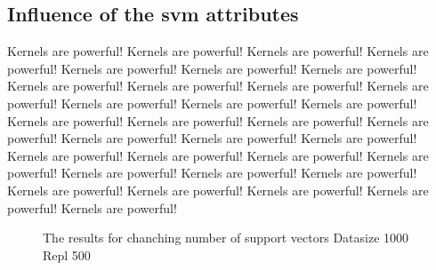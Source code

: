 \documentclass[a4paper]{article}
\begin{document}
\subsection{Influence of the svm attributes}
 Kernels are powerful! Kernels are powerful! Kernels are powerful! Kernels are powerful! Kernels are powerful! Kernels are powerful! Kernels are powerful! Kernels are powerful! Kernels are powerful! Kernels are powerful! Kernels are powerful! Kernels are powerful! Kernels are powerful! Kernels are powerful! Kernels are powerful! Kernels are powerful! Kernels are powerful! Kernels are powerful! Kernels are powerful! Kernels are powerful! Kernels are powerful! Kernels are powerful! Kernels are powerful! Kernels are powerful! Kernels are powerful! Kernels are powerful! Kernels are powerful! Kernels are powerful! Kernels are powerful! Kernels are powerful! Kernels are powerful! Kernels are powerful! Kernels are powerful! 

\begin{figure}[!htb]
\begin{center}

\caption{The results for chanching number of support vectors Datasize 1000 Repl 500}
\label{fig1}
\end{center}
\end{figure}
\end{document}
